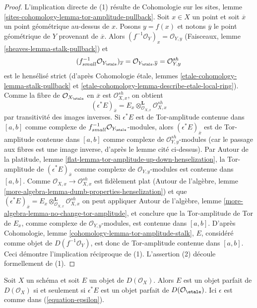 \begin{proof}
L'implication directe de (1) r\'esulte de Cohomologie sur les sites, lemme
\ref{sites-cohomology-lemma-tor-amplitude-pullback}.
Soit $x \in X$ un point et soit $\overline{x}$ un point g\'eom\'etrique
au-dessus de $x$. Posons $y=f(x)$ et notons $\overline{y}$ le point
g\'eom\'etrique de $Y$ provenant de $\overline{x}$. Alors
$(f^{-1}\mathcal{O}_Y)_x = \mathcal{O}_{Y,y}$ (Faisceaux, lemme
\ref{sheaves-lemma-stalk-pullback}) et
$$
(f_{small}^{-1}\mathcal{O}_{Y_\etale})_{\overline{x}} =
\mathcal{O}_{Y_\etale, \overline{y}} =
\mathcal{O}_{Y, y}^{sh}
$$
est le hens\'elis\'e strict (d'apr\`es Cohomologie \'etale, lemmes
\ref{etale-cohomology-lemma-stalk-pullback} et
\ref{etale-cohomology-lemma-describe-etale-local-ring}).
Comme la fibre de $\mathcal{O}_{X_\etale}$ en $\overline{x}$ est
$\mathcal{O}_{X,x}^{sh}$, on obtient
$$
(\epsilon^*E)_{\overline{x}} =
E_x \otimes_{\mathcal{O}_{X, x}}^\mathbf{L} \mathcal{O}_{X, x}^{sh}
$$
par transitivit\'e des images inverses. Si $\epsilon^*E$ est de Tor-amplitude
contenue dans $[a,b]$ comme complexe de
$f_{small}^{-1}\mathcal{O}_{Y_\etale}$-modules, alors
$(\epsilon^*E)_{\overline{x}}$ est de Tor-amplitude contenue dans $[a,b]$
comme
complexe de $\mathcal{O}_{Y,y}^{sh}$-modules (car le passage aux fibres est
une image inverse, d'apr\`es le lemme cit\'e ci-dessus). Par Autour de la
platitude, lemme \ref{flat-lemma-tor-amplitude-up-down-henselization},
la Tor-amplitude de
$(\epsilon^*E)_{\overline{x}}$
comme complexe de $\mathcal{O}_{Y,y}$-modules est contenue dans $[a,b]$.
Comme $\mathcal{O}_{X,x} \to \mathcal{O}_{X,x}^{sh}$ est fid\`element plat
(Autour de l'alg\`ebre, lemme
\ref{more-algebra-lemma-dumb-properties-henselization}) et que
$(\epsilon^*E)_{\overline{x}} =
E_x \otimes_{\mathcal{O}_{X, x}}^\mathbf{L} \mathcal{O}_{X, x}^{sh}$
on peut appliquer Autour de l'alg\`ebre, lemme
\ref{more-algebra-lemma-no-change-tor-amplitude}, et conclure que la
Tor-amplitude
de Tor de $E_x$, comme complexe de $\mathcal{O}_{Y,y}$-modules, est contenue
dans $[a,b]$. D'apr\`es Cohomologie, lemme
\ref{cohomology-lemma-tor-amplitude-stalk}, $E$, consid\'er\'e comme objet de
$D(f^{-1}\mathcal{O}_Y)$, est donc de Tor-amplitude contenue dans $[a,b]$.
Ceci d\'emontre l'implication r\'eciproque de (1). L'assertion (2) d\'ecoule
formellement de (1).
\end{proof}

\begin{lemma}
\label{lemma-descend-perfect}
Soit $X$ un sch\'ema et soit $E$ un objet de $D(\mathcal{O}_X)$. Alors $E$ est
un objet parfait de $D(\mathcal{O}_X)$ si et seulement si $\epsilon^*E$ est
un objet parfait de $D(\mathcal{O}_\etale)$. Ici $\epsilon$ est comme dans
(\ref{equation-epsilon}).
\end{lemma}

